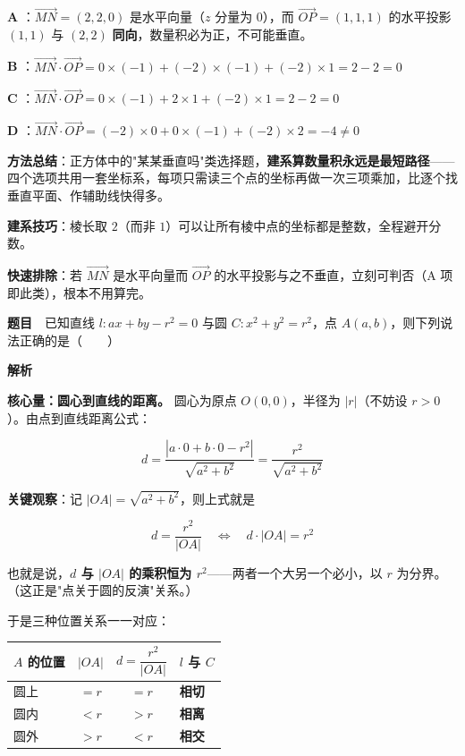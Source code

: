 \textbf{A }：$\overrightarrow{MN}=(2,2,0)$ 是水平向量（$z$ 分量为 $0$），而 $\overrightarrow{OP}=(1,1,1)$ 的水平投影 $(1,1)$ 与 $(2,2)$ \textbf{同向}，数量积必为正，不可能垂直。

\textbf{B }：$\overrightarrow{MN}\cdot\overrightarrow{OP}=0\times(-1)+(-2)\times(-1)+(-2)\times1=2-2=0$ 

\textbf{C }：$\overrightarrow{MN}\cdot\overrightarrow{OP}=0\times(-1)+2\times1+(-2)\times1=2-2=0$ 

\textbf{D }：$\overrightarrow{MN}\cdot\overrightarrow{OP}=(-2)\times0+0\times(-1)+(-2)\times2=-4\ne0$ 


\begin{gktip}
\textbf{方法总结}：正方体中的"某某垂直吗"类选择题，\textbf{建系算数量积永远是最短路径}——四个选项共用一套坐标系，每项只需读三个点的坐标再做一次三项乘加，比逐个找垂直平面、作辅助线快得多。

\textbf{建系技巧}：棱长取 $2$（而非 $1$）可以让所有棱中点的坐标都是整数，全程避开分数。

\textbf{快速排除}：若 $\overrightarrow{MN}$ 是水平向量而 $\overrightarrow{OP}$ 的水平投影与之不垂直，立刻可判否（A 项即此类），根本不用算完。
\end{gktip}

\par\medskip


\textbf{题目}　已知直线 $l:ax+by-r^{2}=0$ 与圆 $C:x^{2}+y^{2}=r^{2}$，点 $A(a,b)$，则下列说法正确的是（　　）

\textbf{解析}

\textbf{核心量：圆心到直线的距离。} 圆心为原点 $O(0,0)$，半径为 $|r|$（不妨设 $r>0$）。由点到直线距离公式：

\[d=\frac{\left|a\cdot0+b\cdot0-r^{2}\right|}{\sqrt{a^{2}+b^{2}}}=\frac{r^{2}}{\sqrt{a^{2}+b^{2}}}\]

\textbf{关键观察}：记 $|OA|=\sqrt{a^{2}+b^{2}}$，则上式就是

\[\boxed{\ d=\frac{r^{2}}{|OA|}\quad\Longleftrightarrow\quad d\cdot|OA|=r^{2}\ }\]

也就是说，\textbf{$d$ 与 $|OA|$ 的乘积恒为 $r^{2}$}——两者一个大另一个必小，以 $r$ 为分界。（这正是"点关于圆的反演"关系。）

于是三种位置关系一一对应：

\begin{center}
\begin{tabular}{lccl}
\toprule
$A$ 的位置 & $\lvert OA\rvert$ & $d=\dfrac{r^{2}}{\lvert OA\rvert}$ & $l$ 与 $C$ \\
\midrule
圆上 & $=r$ & $=r$ & \textbf{相切} \\
圆内 & $<r$ & $>r$ & \textbf{相离} \\
圆外 & $>r$ & $<r$ & \textbf{相交} \\
\bottomrule
\end{tabular}
\end{center}


